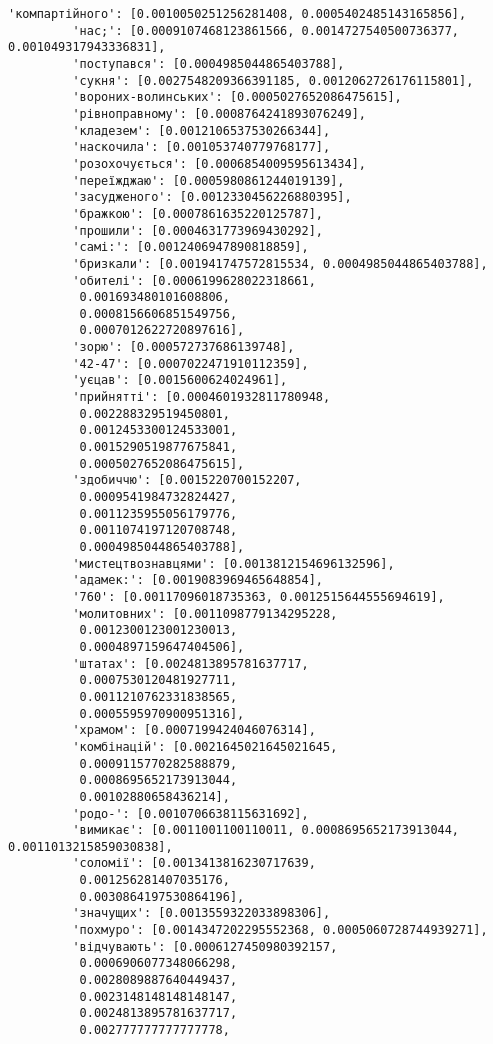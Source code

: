 \documentclass[11pt]{article}
\begin{document}
\begin{Verbatim}[commandchars=\\\{\}]
         'компартійного': [0.0010050251256281408, 0.0005402485143165856],
         'нас;': [0.0009107468123861566, 0.0014727540500736377, 0.001049317943336831],
         'поступався': [0.0004985044865403788],
         'сукня': [0.0027548209366391185, 0.0012062726176115801],
         'вороних-волинських': [0.0005027652086475615],
         'рівноправному': [0.0008764241893076249],
         'кладезем': [0.0012106537530266344],
         'наскочила': [0.001053740779768177],
         'розохочується': [0.0006854009595613434],
         'переїжджаю': [0.0005980861244019139],
         'засудженого': [0.0012330456226880395],
         'бражкою': [0.0007861635220125787],
         'прошили': [0.0004631773969430292],
         'самі:': [0.0012406947890818859],
         'бризкали': [0.001941747572815534, 0.0004985044865403788],
         'обителі': [0.0006199628022318661,
          0.001693480101608806,
          0.0008156606851549756,
          0.0007012622720897616],
         'зорю': [0.000572737686139748],
         '42-47': [0.0007022471910112359],
         'уєцав': [0.0015600624024961],
         'прийнятті': [0.0004601932811780948,
          0.002288329519450801,
          0.0012453300124533001,
          0.0015290519877675841,
          0.0005027652086475615],
         'здобиччю': [0.0015220700152207,
          0.0009541984732824427,
          0.0011235955056179776,
          0.0011074197120708748,
          0.0004985044865403788],
         'мистецтвознавцями': [0.0013812154696132596],
         'адамек:': [0.0019083969465648854],
         '760': [0.00117096018735363, 0.0012515644555694619],
         'молитовних': [0.0011098779134295228,
          0.0012300123001230013,
          0.0004897159647404506],
         'штатах': [0.0024813895781637717,
          0.0007530120481927711,
          0.0011210762331838565,
          0.0005595970900951316],
         'храмом': [0.0007199424046076314],
         'комбінацій': [0.0021645021645021645,
          0.0009115770282588879,
          0.0008695652173913044,
          0.00102880658436214],
         'родо-': [0.0010706638115631692],
         'вимикає': [0.0011001100110011, 0.0008695652173913044, 0.0011013215859030838],
         'соломії': [0.0013413816230717639,
          0.001256281407035176,
          0.0030864197530864196],
         'значущих': [0.0013559322033898306],
         'похмуро': [0.0014347202295552368, 0.0005060728744939271],
         'відчувають': [0.0006127450980392157,
          0.0006906077348066298,
          0.0028089887640449437,
          0.0023148148148148147,
          0.0024813895781637717,
          0.002777777777777778,

\end{Verbatim}
\end{document}
